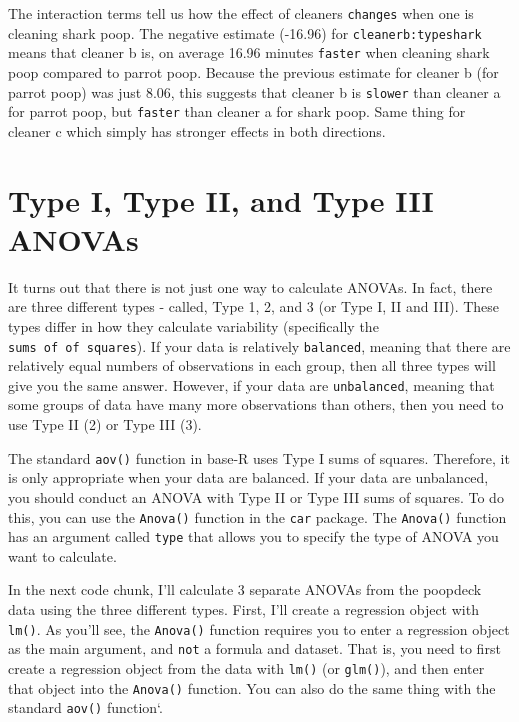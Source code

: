 \documentclass[]{book}
\theoremstyle{definition}
\theoremstyle{definition}
\theoremstyle{remark}
\begin{document}
The interaction terms tell us how the effect of cleaners
\texttt{changes} when one is cleaning shark poop. The negative estimate
(-16.96) for \texttt{cleanerb:typeshark} means that cleaner b is, on
average 16.96 minutes \texttt{faster} when cleaning shark poop compared
to parrot poop. Because the previous estimate for cleaner b (for parrot
poop) was just 8.06, this suggests that cleaner b is \texttt{slower}
than cleaner a for parrot poop, but \texttt{faster} than cleaner a for
shark poop. Same thing for cleaner c which simply has stronger effects
in both directions.

\section{Type I, Type II, and Type III
ANOVAs}\label{type-i-type-ii-and-type-iii-anovas}

It turns out that there is not just one way to calculate ANOVAs. In
fact, there are three different types - called, Type 1, 2, and 3 (or
Type I, II and III). These types differ in how they calculate
variability (specifically the \texttt{sums\ of\ of\ squares}). If your
data is relatively \texttt{balanced}, meaning that there are relatively
equal numbers of observations in each group, then all three types will
give you the same answer. However, if your data are \texttt{unbalanced},
meaning that some groups of data have many more observations than
others, then you need to use Type II (2) or Type III (3).

The standard \texttt{aov()} function in base-R uses Type I sums of
squares. Therefore, it is only appropriate when your data are balanced.
If your data are unbalanced, you should conduct an ANOVA with Type II or
Type III sums of squares. To do this, you can use the \texttt{Anova()}
function in the \texttt{car} package. The \texttt{Anova()} function has
an argument called \texttt{type} that allows you to specify the type of
ANOVA you want to calculate.

In the next code chunk, I'll calculate 3 separate ANOVAs from the
poopdeck data using the three different types. First, I'll create a
regression object with \texttt{lm()}. As you'll see, the
\texttt{Anova()} function requires you to enter a regression object as
the main argument, and \texttt{not} a formula and dataset. That is, you
need to first create a regression object from the data with
\texttt{lm()} (or \texttt{glm()}), and then enter that object into the
\texttt{Anova()} function. You can also do the same thing with the
standard \texttt{aov()} function`.
\end{document}
